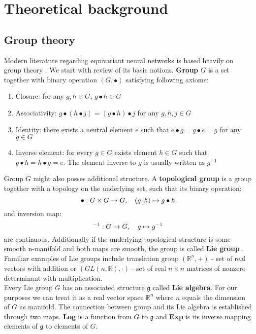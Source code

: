 \section{Theoretical background}

\subsection{Group theory}
    Modern literature regarding equivariant neural networks is based heavily on
    group theory \cite{algebra}. We start with review of its basic notions.
    \textbf{Group} $G$ is a set together with binary operation $\left(G, \bullet \right)$ satisfying
    following axioms:
    \begin{enumerate}
        \item Closure: for any $g, h \in G$, $g \bullet h \in G$
        \item Associativity:  $g\bullet \left(h \bullet j \right) =
                    \left(g \bullet h \right) \bullet j$ for any $g,h,j \in G$
        \item Identity: there exists a neutral element $e$ such that
                $e \bullet g = g \bullet e = g$ for any $g \in G$
        \item Inverse element: for every $g \in G$ exists element $h \in G$ such that
                $g \bullet h = h\bullet g = e$. The element inverse to $g$ is usually
                written as $g^{-1}$
    \end{enumerate}
    \par Group $G$ might also posses additional structure. A \textbf{topological group}
        is a group together with a topology on the underlying set,
        such that its binary operation:\\
        $$\bullet: G \times G \to G, \hspace*{1em} \left(g,h \right) \mapsto g\bullet h$$
        and inversion map: \\
        $${}^{-1}: G \to G, \hspace*{1em} g \mapsto g^{-1}$$
        are continuous. Additionally if the underlying topological structure
        is some smooth n-manifold and both maps are smooth, the group is called
        \textbf{Lie group} \cite{lee_manifolds}.
        Familiar examples of Lie groups include translation group
        $\left( \mathbb{R}^n, + \right)$ - set of real vectors with addition or
        $\left(GL(n,\mathbb{R}), \cdot \right)$ - set of real $n \times n$ matrices of nonzero determinant
        with multiplication.\\
        Every Lie group $G$ has an associated structure $\mathfrak{g}$ called \textbf{Lie
        algebra}. For our purposes we can treat it as a real vector space
        $\mathbb{R}^n$ where $n$ equals the dimension of $G$ as manifold. The
        connection between group and its Lie algebra is established through two
        maps. \textbf{Log} is a function from $G$ to $\mathfrak{g}$ and \textbf{Exp}
        is its inverse
        mapping elements of $\mathfrak{g}$ to elements of $G$.



